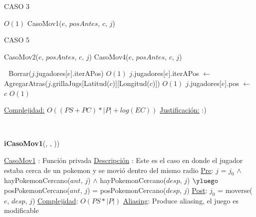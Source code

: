 \begin{Algoritmos}
\begin{algorithmic}[1]
	\Statex $ $
	
	
			\State CASO 3
					
		\Else %
			  \Comment $O(1)$
				\State CasoMov1($e$, $posAntes$, $c$, $j$)
			\Else

				\State CASO 5			
			\EndIf		
		\EndIf
	\Else %
			
			\State CasoMov2($e$, $posAntes$, $c$, $j$)
		\Else
			\State CasoMov4($e$, $posAntes$, $c$, $j$)
		\EndIf		
		
	\EndIf
	
	\Statex $ $
	\Statex $ $
	\State Borrar($j$.jugadores[$e$].iterAPos) \Comment $O(1)$
	\State $j$.jugadores[$e$].iterAPos $\gets$ AgregarAtras($j$.grillaJugs[Latitud($c$)][Longitud($c$)]) \Comment $O(1)$
	\State $j$.jugadores[$e$].pos $\gets$ $c$ \Comment $O(1)$	
	
\EndIf

\medskip
\State \underline{Complejidad:} $O((PS + PC)*|P| + log(EC))$ 
\State \underline{Justificaci\'on:} :)

\end{algorithmic}



$ $\newline
$ $\newline


{\textbf{iCasoMov1}(,  , ))}
\begin{algorithmic}[1]

\Statex \underline{CasoMov1} : Funci\'on privada 
\Statex \underline{Descripci\'on} : Este es el caso en donde el jugador estaba cerca de un pokemon y se movi\'o dentro del mismo radio 
\Statex \underline{Pre}: $j$ = $j_0$ $\land$ hayPokemonCercano($ant$, $j$) $\land$ hayPokemonCercano($desp$, $j$) $\yluego$ posPokemonCercano($ant$, $j$) = posPokemonCercano($desp$, $j$) 
\Statex \underline{Post}: $j_0$ = moverse($e$, $desp$, $j$) 
\Statex \underline{Complejidad}: $O(PS *|P|)$ 
\Statex \underline{Aliasing}: Produce aliasing, el juego es modificable


\end{algorithmic}
\end{Algoritmos}
